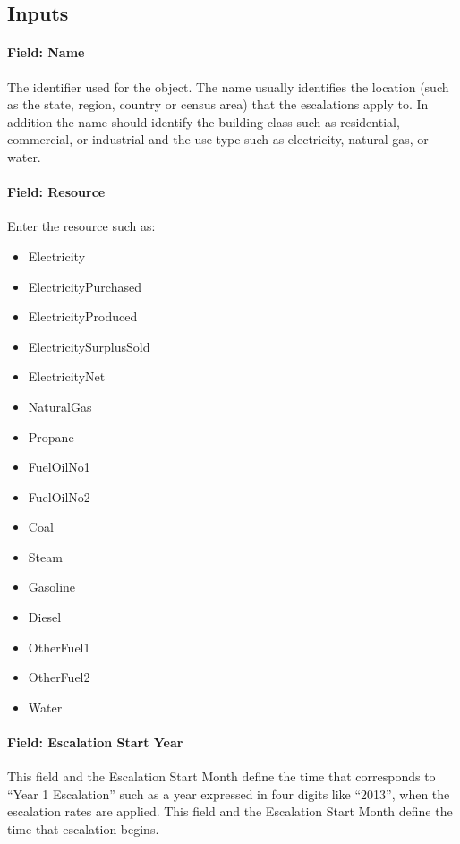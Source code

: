 \subsection{Inputs}\label{inputs-061}

\paragraph{Field: Name}\label{field-name-059}

The identifier used for the object. The name usually identifies the location (such as the state, region, country or census area) that the escalations apply to. In addition the name should identify the building class such as residential, commercial, or industrial and the use type such as electricity, natural gas, or water.

\paragraph{Field: Resource}\label{field-resource-000}

Enter the resource such as:

\begin{itemize}
\item
  Electricity
\item
  ElectricityPurchased
\item
  ElectricityProduced
\item
  ElectricitySurplusSold
\item
  ElectricityNet
\item
  NaturalGas
\item
  Propane
\item
  FuelOilNo1
\item
  FuelOilNo2
\item
  Coal
\item
  Steam
\item
  Gasoline
\item
  Diesel
\item
  OtherFuel1
\item
  OtherFuel2
\item
  Water
\end{itemize}

\paragraph{Field: Escalation Start Year}\label{field-escalation-start-year}

This field and the Escalation Start Month define the time that corresponds to ``Year 1 Escalation'' such as a year expressed in four digits like ``2013'', when the escalation rates are applied. This field and the Escalation Start Month define the time that escalation begins.

